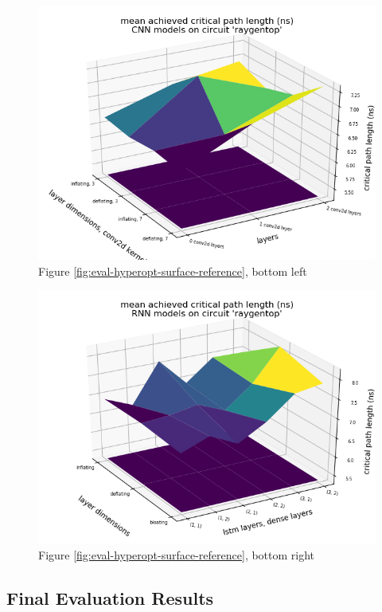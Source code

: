 \begin{figure}[H]
	\includegraphics[width=\linewidth]{plots/cnn-hyperopt-critical-path-with-reference.png}
	\caption{Figure \ref{fig:eval-hyperopt-surface-reference}, bottom left}
\end{figure}

\begin{figure}[H]
	\includegraphics[width=\linewidth]{plots/rnn-hyperopt-critical-path-with-reference.png}
	\caption{Figure \ref{fig:eval-hyperopt-surface-reference}, bottom right}
\end{figure}

\subsection{Final Evaluation Results}

